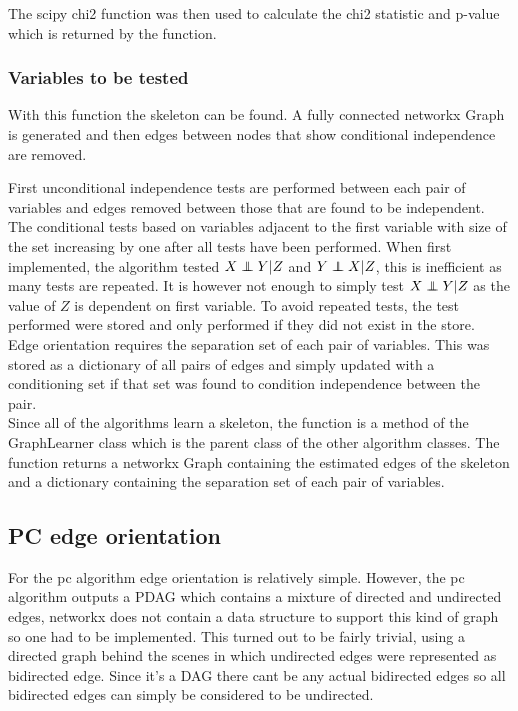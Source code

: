 \documentclass{article}
\newcommand\independent{\protect\mathpalette{\protect\independenT}{\perp}}
\def\independenT#1#2{\mathrel{\rlap{$#1#2$}\mkern2mu{#1#2}}}
\begin{document}
The scipy chi2 function was then used to calculate the chi2 statistic and p-value which is returned by the function.\\

\subsubsection{Variables to be tested}
With this function the skeleton can be found. A fully connected networkx Graph is generated and then edges between nodes that show conditional independence are removed. 

First unconditional independence tests are performed between each pair of variables and edges removed between those that are found to be independent. The conditional tests based on variables adjacent to the first variable with size of the set increasing by one after all tests have been performed. When first implemented, the algorithm tested $X \independent Y | Z$ and $Y \independent X | Z$, this is inefficient as many tests are repeated. It is however not enough to simply test $X \independent Y | Z$ as the value of $Z$ is dependent on first variable. To avoid repeated tests, the test performed were stored and only performed if they did not exist in the store.\\

Edge orientation requires the separation set of each pair of variables. This was stored as a dictionary of all pairs of edges and simply updated with a conditioning set if that set was found to condition independence between the pair.\\

Since all of the algorithms learn a skeleton, the function is a method of the GraphLearner class which is the parent class of the other algorithm classes. The function returns a networkx Graph containing the estimated edges of the skeleton and a dictionary containing the separation set of each pair of variables.\\

\subsection{PC edge orientation}
For the pc algorithm edge orientation is relatively simple. However, the pc algorithm outputs a PDAG which contains a mixture of directed and undirected edges, networkx does not contain a data structure to support this kind of graph so one had to be implemented. This turned out to be fairly trivial, using a directed graph behind the scenes in which undirected edges were represented as bidirected edge. Since it's a DAG there cant be any actual bidirected edges so all bidirected edges can simply be considered to be undirected.\\
\end{document}
